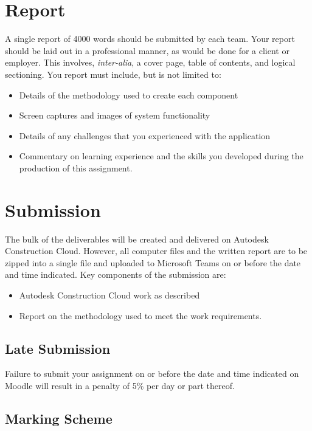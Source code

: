 \newpage
\section{Report}
A single report of 4000 words should be submitted by each team.  Your report should be laid out in a professional manner, as would be done for a client or employer.  This involves, \emph{inter-alia}, a cover page, table of contents, and logical sectioning.  You report must include, but is not limited to:
\begin{itemize}
	\item Details of the methodology used to create each component
	\item Screen captures and images of system functionality
	\item Details of any challenges that you experienced with the application
	\item Commentary on learning experience and the skills you developed during the production of this assignment.
\end{itemize}
  


\section{Submission}
The bulk of the deliverables will be created and delivered on Autodesk Construction Cloud.  However, all computer files and the written report are to be zipped into a single file and uploaded to Microsoft Teams on or before the date and time indicated.  Key components of the submission are:

\begin{itemize}
	\item Autodesk Construction Cloud work as described
	\item Report on the methodology used to meet the work requirements.  
\end{itemize}



\subsection*{Late Submission}
Failure to submit your assignment on or before the date and time indicated on Moodle will result in a penalty of 5\% per day or part thereof.

\subsection*{Marking Scheme}


